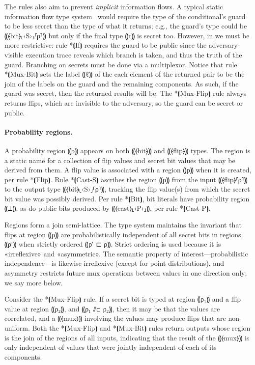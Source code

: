 The rules also aim to prevent \emph{implicit} information flows. A
typical static information flow type system~\cite{infoflow} would
require the type of the conditional's guard
to be less secret than the type of what it returns; e.g., the guard's
type could be ⸨⦑bit⦒⸤‹S›⸥⸢ρ⸣⸩ but only if the final type ⸨τ⸩ is secret
too. However, in \obliv we must be more restrictive: rule *⦗If⦘
requires the guard to be public since the
adversary-visible execution trace reveals which branch is taken, and
thus the truth of the guard. Branching on secrets must be done via
a multiplexor. Notice that rule *⦗Mux-Bit⦘ sets the label ⸨ℓ⸩ of the
each element of the returned pair to be the join of the labels on the
guard and the remaining components. As such, if the guard was secret,
then the returned results will be.  The *⦗Mux-Flip⦘ rule
always returns flips, which are invisible to the adversary, so the
guard can be secret or public.

\paragraph*{Probability regions.}
%
A probability region ⸨ρ⸩ appears on both ⸨⦑bit⦒⸩ and ⸨⦑flip⦒⸩
types. The region is a static name for a collection of flip values and
secret bit values that may be derived from them. A flip value is
associated with a region ⸨ρ⸩ when it is created, per rule *⦗Flip⦘. Rule
*⦗Cast-S⦘ ascribes the region ⸨ρ⸩ from the input ⸨⦑flip⦒⸢ρ⸣⸩ to the
output type ⸨⦑bit⦒⸤‹S›⸥⸢ρ⸣⸩, tracking the flip value(s) from which the
secret bit value was possibly derived. Per rule *⦗Bit⦘, bit literals
have probability region ⸨⊥⸩, as do public bits produced by
⸨⦑cast⦒⸤‹P›⸥⸩, per rule *⦗Cast-P⦘.

Regions form a join semi-lattice.
%
The type system maintains the invariant that flips at region ⸨ρ⸩ are
probabilistically independent of all secret bits in regions ⸨ρ′⸩ when
strictly ordered ⸨ρ′ ⊏ ρ⸩. Strict ordering is used because it is
«irreflexive» and «asymmetric». The semantic property of
interest—probabilistic independence—is likewise irreflexive (except
for point distributions), and asymmetry restricts future mux operations
between values in one direction only; we say more below.

Consider the *⦗Mux-Flip⦘ rule. If a secret
bit is typed at region ⸨ρ₁⸩ and a flip value at region ⸨ρ₂⸩, and ⸨ρ₁ ⫽⊏ ρ₂⸩,
then it may be that the values are correlated, and a ⸨⦑mux⦒⸩ involving the
values may produce flips that are non-uniform.
Both the *⦗Mux-Flip⦘ and *⦗Mux-Bit⦘ rules return outputs whose region is the join
of the regions of all inputs, indicating that the result of the ⸨⦑mux⦒⸩ is only
independent of values that were jointly independent of each of its components.

